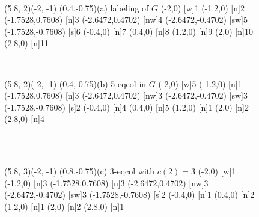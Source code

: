 \begin{figure}[h]
  \centering ~~~~~~~~~~~
\begin{graph}(5.8, 2)(-2, -1)
	\freetext(0.4,-0.75){(a) labeling of $G$}
	(-2,0)
	{1}
	(-1.2,0)
	{2}
	(-1.7528,0.7608)
	{3}
	(-2.6472,0.4702)
	[nw]{4}
	(-2.6472,-0.4702)
	[sw]{5}
	(-1.7528,-0.7608)
	{6}
	(-0.4,0)
	{7}
	(0.4,0)
	{8}
	(1.2,0)
	{9}
	(2,0)
	{10}
	(2.8,0)
	{11}
\end{graph}~~~~~~~
\begin{graph}(5.8, 2)(-2, -1)
	\freetext(0.4,-0.75){(b) 5-eqcol in $G$}
	(-2,0)
	{5}
	(-1.2,0)
	{1}
	(-1.7528,0.7608)
	{3}
	(-2.6472,0.4702)
	[nw]{3}
	(-2.6472,-0.4702)
	[sw]{3}
	(-1.7528,-0.7608)
	{2}
	(-0.4,0)
	{4}
	(0.4,0)
	{5}
	(1.2,0)
	{1}
	(2,0)
	{2}
	(2.8,0)
	{4}
\end{graph}\\~~~~~~~~~~~
\begin{graph}(5.8, 3)(-2, -1)
	\freetext(0.8,-0.75){(c) 3-eqcol with $c(2)=3$}
	(-2,0)
	{1}
	(-1.2,0)
	{3}
	(-1.7528,0.7608)
	{3}
	(-2.6472,0.4702)
	[nw]{3}
	(-2.6472,-0.4702)
	[sw]{3}
	(-1.7528,-0.7608)
	{2}
	(-0.4,0)
	{1}
	(0.4,0)
	{2}
	(1.2,0)
	{1}
	(2,0)
	{2}
	(2.8,0)
	{1}

\end{graph}
\end{figure}

